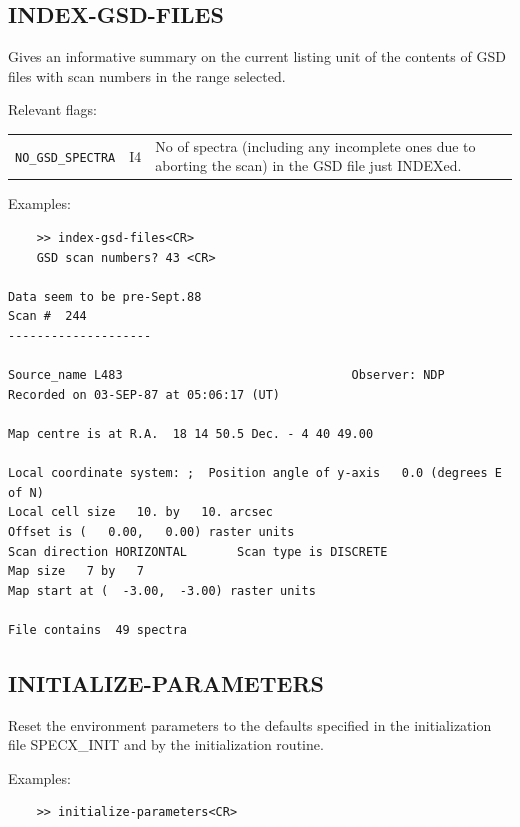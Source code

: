 \documentclass[11pt,twoside]{report}
\begin{document}
\subsection{INDEX-GSD-FILES} 

Gives an informative summary on the current listing unit of the contents
of GSD files with scan numbers in the range selected.

Relevant flags:\\
\begin{tabular}{lll}
  \verb+NO_GSD_SPECTRA+ & I4 & \parbox[t]{4in}
                               {No of spectra (including any incomplete
                                ones due to aborting the scan) in the
                                GSD file just INDEXed.}
\end{tabular}

Examples:

\begin{verbatim}
    >> index-gsd-files<CR>
    GSD scan numbers? 43 <CR>

Data seem to be pre-Sept.88
Scan #  244
--------------------

Source_name L483                                Observer: NDP
Recorded on 03-SEP-87 at 05:06:17 (UT)

Map centre is at R.A.  18 14 50.5 Dec. - 4 40 49.00

Local coordinate system: ;  Position angle of y-axis   0.0 (degrees E of N)
Local cell size   10. by   10. arcsec
Offset is (   0.00,   0.00) raster units
Scan direction HORIZONTAL       Scan type is DISCRETE
Map size   7 by   7
Map start at (  -3.00,  -3.00) raster units

File contains  49 spectra
\end{verbatim}

\subsection{INITIALIZE-PARAMETERS} 

Reset the environment  parameters to the defaults
specified in the initialization file SPECX\_INIT  and by the
initialization routine.

Examples:
\begin{verbatim}
    >> initialize-parameters<CR>
\end{verbatim}
\end{document}

